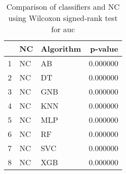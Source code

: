 \begin{table}
\footnotesize
\caption{Comparison of classifiers and NC using Wilcoxon signed-rank test for auc}
\label{tab:NC wilcoxon AUC comparison}
\begin{tabular}{lllr}
\hline
 & NC & Algorithm & p-value \\
\hline
1 & NC & AB & 0.000000 \\
2 & NC & DT & 0.000000 \\
3 & NC & GNB & 0.000000 \\
4 & NC & KNN & 0.000000 \\
5 & NC & MLP & 0.000000 \\
6 & NC & RF & 0.000000 \\
7 & NC & SVC & 0.000000 \\
8 & NC & XGB & 0.000000 \\
\hline
\end{tabular}
\end{table}
